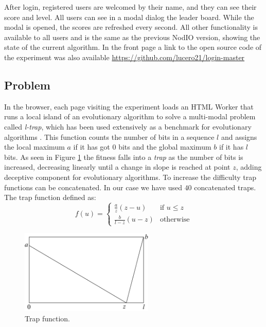 \documentclass{llncs}
\begin{document}
After login, registered users are welcomed by their name, and they can see
their score and level. All users can see in a modal dialog the leader board.
While the modal is opened, the scores are refreshed every second. All other 
functionality is available to all users and is the same as the previous 
{\sf NodIO} version, showing the state of the current algorithm. 
In the front page a link to the open source code of the experiment was also 
available \url{https://github.com/lucero21/login-master} 


\subsection{Problem}
In the browser, each page visiting the experiment loads an HTML Worker
that runs a local island of an evolutionary algorithm to solve a
multi-modal problem called {\em l-trap}, which has been used extensively 
as a benchmark for evolutionary algorithms \cite{fernandes2009using,nijssen2003analysis}. 
This function counts the number of bits in a sequence $l$ and assigns
the local maximum $a$ if it has got 0 bits and the global maximum $b$ if it has $l$
bits. As seen in Figure \ref{fig:trap} the fitness falls into a {\em trap} 
as the number of bits is increased, decreasing linearly until a change in slope 
is reached at point $z$, adding deceptive component for evolutionary algorithms. 
To increase the difficulty trap functions can be concatenated. 
In our case we have used $40$ concatenated traps. The trap function  defined as:   
\[ f(u)= 
    \begin{cases} 
      \frac{a}{z}(z-u) & \text{if } u\leq z\\
      \frac{b}{l-z} (u-z)& \text{otherwise} 
   \end{cases}
\]
\begin{figure}[htbp]
    \centering
        \includegraphics[width=2.5in]{img/trap.png}
    \caption{Trap function.
    }
    \label{fig:trap}
\end{figure}
%
\end{document}
